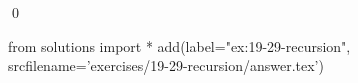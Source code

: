 
\begin{ex}
  \label{ex:19-29-recursion}
  
  \qed
\end{ex}
\begin{python0}
from solutions import *
add(label="ex:19-29-recursion",
    srcfilename='exercises/19-29-recursion/answer.tex')
\end{python0}
